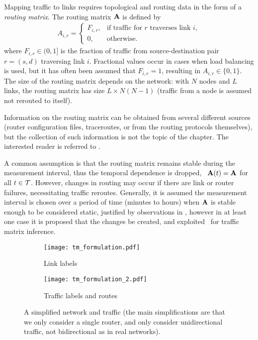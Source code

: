 Mapping traffic to links requires topological and routing data in the
form of a \emph{routing matrix}. The routing matrix $\mathbf{A}$ is defined
by
\begin{align*}
A_{i,r} = 
\begin{cases}
F_{i,r}, & \text{if traffic for $r$ traverses link $i$},\\
0, & \text{otherwise}.
\end{cases}
\end{align*}
where $F_{i,r} \in (0,1]$ is the fraction of traffic from
source-destination pair $r = (s,d)$ traversing link $i$. Fractional
values occur in cases when load balancing is used, but it has often
been assumed that $F_{i,r} = 1$, resulting in $A_{i,r} \in
\{0,1\}$. The size of the routing matrix depends on the network: with
$N$ nodes and $L$ links, the routing matrix has size $L \times N(N-1)$
(traffic from a node is assumed not rerouted to itself).

Information on the routing matrix can be obtained from several
different sources (router configuration files, traceroutes, or from
the routing protocols themselves), but the collection of such
information is not the topic of the chapter. The interested reader is
referred to \cite{Feldmann00Netscope,Feldmann01TMdemand}.  

A common assumption is that the routing matrix remains stable during
the measurement interval, thus the temporal dependence is dropped,
\ie~$\mathbf{A}(t) = \mathbf{A}$ for all $t \in \mathcal{T}$. However, changes in routing
may occur if there are link or router failures, necessitating traffic
reroutes. Generally, it is assumed the measurement interval is chosen
over a period of time (minutes to hours) when $\mathbf{A}$ is stable enough
to be considered static, justified by observations in
\cite{Paxson97Routing}, however in at least one case it is proposed
that the changes be created, and
exploited~\cite{soule07:_estim_dynam_traff_matric_using} for traffic
matrix inference.


\begin{figure}[!thbp] 
  \begin{center}
    \hfill
    \begin{subfigure}[b]{\twoup}
      \centering
      \texttt{[image: tm\_formulation.pdf]}
      \caption{Link labels}
      \label{fig:tomo_a}
    \end{subfigure}
    \hfill
    \begin{subfigure}[b]{\twoup}
      \centering
      \texttt{[image: tm\_formulation\_2.pdf]}
      \caption{Traffic labels and routes}
      \label{fig:tomo_b}
    \end{subfigure}  
    \hspace*{3mm}
    
    \caption{A simplified network and traffic (the main
      simplifications are that we only consider a single router, and
      only consider unidirectional traffic, not bidirectional as in
      real networks).\label{fig:tomo}}
  \end{center}
\end{figure}         

